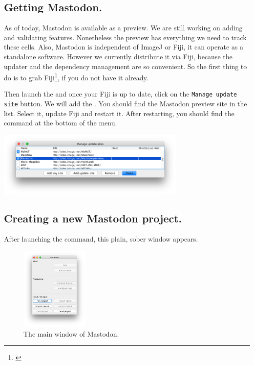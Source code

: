 \subsection{Getting Mastodon.}

As of today, Mastodon is available as a preview. We are still working on adding and validating features.
Nonetheless the preview has everything we need to track these cells.
Also, Mastodon is independent of ImageJ or Fiji, it can operate as a standalone software. 
However we currently distribute it via Fiji, because the updater and the dependency management are so convenient. 
So the first thing to do is to grab Fiji\footnote{\href{http://fiji.sc/}{}}, if you do not have it already.

Then launch the  and once your Fiji is up to date, click on the \texttt{Manage update site} button.
We will add the .
You should find the Mastodon preview site in the list. 
Select it, update Fiji and restart it. 
After restarting, you should find the command  at the bottom of the menu.

\begin{center}
    \includegraphics[width=0.7\textwidth]{figures/Mastodon_UpdateSite.png}
\end{center}

\subsection{Creating a new Mastodon project.}

After launching the command, this plain, sober window appears.
\begin{figure}[!htbp]
    \centering
    \includegraphics[width=0.3\textwidth]{figures/Mastodon_MainWindow.png}
    \caption{The main window of Mastodon.}
    \label{fig:MastodonMainWindow}
\end{figure}

